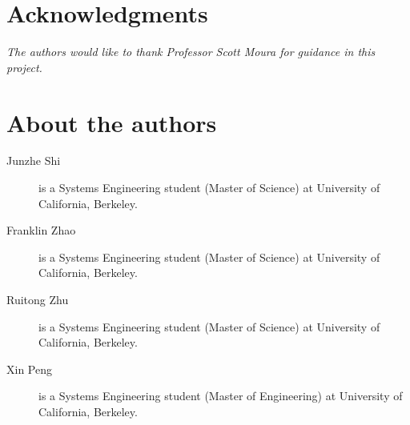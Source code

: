 \documentclass[12pt]{article}
\begin{document}

\section*{Acknowledgments}
\textit{The authors would like to thank Professor Scott Moura for guidance in this project.}


\section*{About the authors}
\begin{description}
    \item[Junzhe Shi] is a Systems Engineering student (Master of Science) at University of California, Berkeley.
    \item[Franklin Zhao] is a Systems Engineering student (Master of Science) at University of California, Berkeley. 
    \item[Ruitong Zhu] is a Systems Engineering student (Master of Science) at University of California, Berkeley. 
    \item[Xin Peng] is a Systems Engineering student (Master of Engineering) at University of California, Berkeley. 
\end{description}
\end{document}
